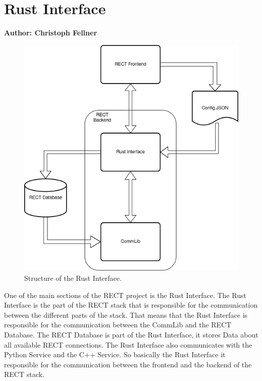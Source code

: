 \section{Rust Interface}
\textbf{Author: Christoph Fellner}

\begin{figure}
	\centering

	\includegraphics[width=\textwidth]{img/RustInterface}

	\caption{Structure of the Rust Interface.}
	\label{fig:rust-interface-architecture}
\end{figure}

One of the main sections of the RECT project is the Rust Interface. The Rust Interface is the part of the RECT stack that is responsible for the communication between 
the different parts of the stack. That means that the Rust Interface is responsible for the communication between the CommLib and the RECT Database. The RECT Database is 
part of the Rust Interface, it stores Data about all available RECT connections. The Rust Interface also communicates with the Python Service and the C++ Service. So 
basically the Rust Interface it responsible for the communication between the frontend and the backend of the RECT stack.\newline

